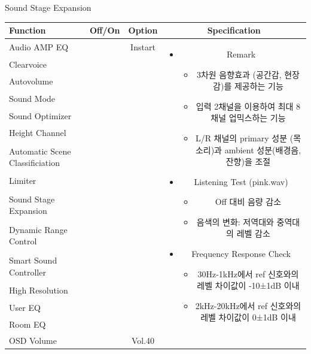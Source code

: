 \documentclass{beamer}
\begin{document}
\begin{frame}[t]{Sound Stage Expansion}
\begin{tiny}
\begin{tabular}{@{}lccc@{}}
\toprule
Function & Off/On & Option & Specification \\
\midrule
Audio AMP EQ & \color{black}{Off} & Instart &
\multirow{14}{60mm}{
\begin{itemize}
\item Remark
	\begin{itemize}
	\item 3차원 음향효과 (공간감, 현장감)를 제공하는 기능
	\item 입력 2채널을 이용하여 최대 8채널 업믹스하는 기능
	\item L/R 채널의 primary 성분 (목소리)과 ambient 성분(배경음, 잔향)을 조절
	\end{itemize}
\item Listening Test (pink.wav)
	\begin{itemize}
	\item Off 대비 음량 감소
	\item 음색의 변화: 저역대와 중역대의 레벨 감소
	\end{itemize}
\item Frequency Response Check
  \begin{itemize}
  \item 30Hz-1kHz에서 ref 신호와의 레벨 차이값이 -10±1dB 이내
  \item 2kHz-20kHz에서 ref 신호와의 레벨 차이값이 0±1dB 이내
  \end{itemize}
\end{itemize}
} \\
Clearvoice & \color{black}{Off} & & \\
Autovolume & \color{black}{Off} & & \\
Sound Mode & \color{black}{Off} & & \\
Sound Optimizer & \color{black}{Off} & & \\
Height Channel & \color{black}{Off} & & \\
Automatic Scene Classificiation & \color{black}{Off} & & \\
Limiter & \color{black}{Off} & & \\
Sound Stage Expansion & \color{blue}{On} & & \\
Dynamic Range Control & \color{black}{Off} & & \\
Smart Sound Controller & \color{black}{Off} & & \\
High Resolution & \color{black}{Off} & & \\
User EQ & \color{black}{Off} & & \\
Room EQ & \color{black}{Off} & & \\
OSD Volume & \color{blue}{On} & Vol.40 & \\
\midrule
\end{tabular}
\end{tiny}


\end{frame}
\end{document}
